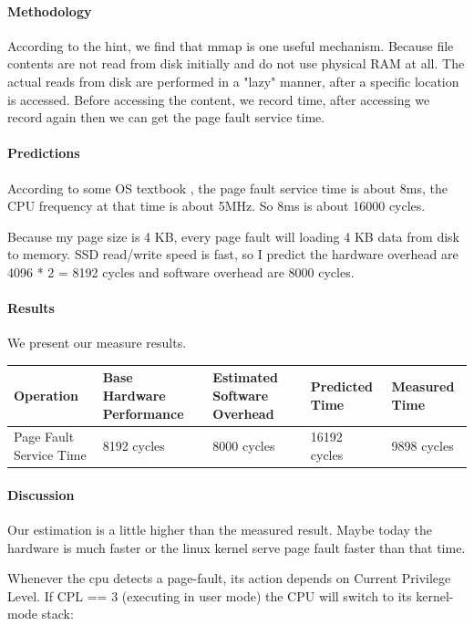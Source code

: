 \paragraph{Methodology}
According to the hint, we find that mmap is one useful mechanism. Because file contents are not read from disk initially and do not use physical RAM at all. The actual reads from disk are performed in a "lazy" manner, after a specific location is accessed. Before accessing the content, we record time, after accessing we record again then we can get the page fault service time.

\paragraph{Predictions}
According to some OS textbook \cite{page}, the page fault service time is about 8ms, the CPU frequency at that time is about 5MHz. So 8ms is about 16000 cycles.

Because my page size is 4 KB, every page fault will loading 4 KB data from disk to memory. SSD read/write speed is fast, so I predict the hardware overhead are 4096 * 2 = 8192 cycles and software overhead are 8000 cycles.

\paragraph{Results}
We present our measure results.

\begin{center}
\begin{tabular}{| p{3cm} | p{3cm} | p{3cm} | p{3cm} | p{3cm} |}
Operation  & Base Hardware Performance  & Estimated Software Overhead  & Predicted Time  & Measured Time   \\
\hline
Page Fault Service Time & 8192 cycles& 8000 cycles& 16192 cycles& 9898 cycles\\

\end{tabular}
\end{center}

\paragraph{Discussion}
Our estimation is a little higher than the measured result. Maybe today the hardware is much faster or the linux kernel serve page fault faster than that time.

Whenever the cpu detects a page-fault, its action depends on Current Privilege Level. If  CPL == 3  (executing in user mode)
the CPU will switch to its kernel-mode stack:

